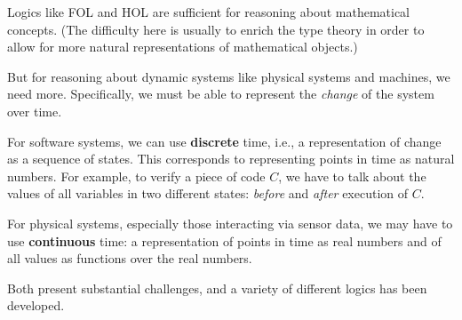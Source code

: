 Logics like FOL and HOL are sufficient for reasoning about mathematical concepts.
(The difficulty here is usually to enrich the type theory in order to allow for more natural representations of mathematical objects.)

But for reasoning about dynamic systems like physical systems and machines, we need more.
Specifically, we must be able to represent the \emph{change} of the system over time.

For software systems, we can use \textbf{discrete} time, i.e., a representation of change as a sequence of states.
This corresponds to representing points in time as natural numbers.
For example, to verify a piece of code $C$, we have to talk about the values of all variables in two different states: \emph{before} and \emph{after} execution of $C$.

For physical systems, especially those interacting via sensor data, we may have to use \textbf{continuous} time: a representation of points in time as real numbers and of all values as functions over the real numbers.

Both present substantial challenges, and a variety of different logics has been developed.
